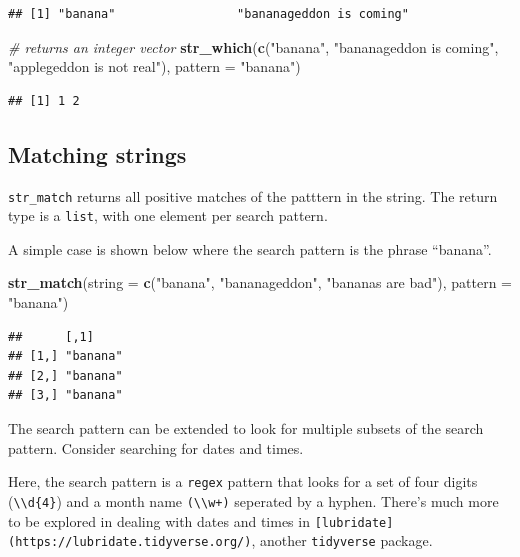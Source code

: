 \documentclass[]{book}
\newenvironment{Shaded}{}{}
\newcommand{\CommentTok}[1]{\textcolor[rgb]{0.38,0.63,0.69}{\textit{#1}}}
\newcommand{\DataTypeTok}[1]{\textcolor[rgb]{0.56,0.13,0.00}{#1}}
\newcommand{\KeywordTok}[1]{\textcolor[rgb]{0.00,0.44,0.13}{\textbf{#1}}}
\newcommand{\NormalTok}[1]{#1}
\newcommand{\StringTok}[1]{\textcolor[rgb]{0.25,0.44,0.63}{#1}}
\begin{document}
\begin{verbatim}
## [1] "banana"                 "bananageddon is coming"
\end{verbatim}

\begin{Shaded}
\begin{Highlighting}[]
\CommentTok{# returns an integer vector}
\KeywordTok{str_which}\NormalTok{(}\KeywordTok{c}\NormalTok{(}\StringTok{"banana"}\NormalTok{,}
             \StringTok{"bananageddon is coming"}\NormalTok{,}
             \StringTok{"applegeddon is not real"}\NormalTok{),}
           \DataTypeTok{pattern =} \StringTok{"banana"}\NormalTok{)}
\end{Highlighting}
\end{Shaded}

\begin{verbatim}
## [1] 1 2
\end{verbatim}

\hypertarget{matching-strings}{%
\subsection{Matching strings}\label{matching-strings}}

\texttt{str\_match} returns all positive matches of the patttern in the string.
The return type is a \texttt{list}, with one element per search pattern.

A simple case is shown below where the search pattern is the phrase ``banana''.

\begin{Shaded}
\begin{Highlighting}[]
\KeywordTok{str_match}\NormalTok{(}\DataTypeTok{string =} \KeywordTok{c}\NormalTok{(}\StringTok{"banana"}\NormalTok{,}
                     \StringTok{"bananageddon"}\NormalTok{,}
                     \StringTok{"bananas are bad"}\NormalTok{),}
          \DataTypeTok{pattern =} \StringTok{"banana"}\NormalTok{)}
\end{Highlighting}
\end{Shaded}

\begin{verbatim}
##      [,1]    
## [1,] "banana"
## [2,] "banana"
## [3,] "banana"
\end{verbatim}

The search pattern can be extended to look for multiple subsets of the search pattern. Consider searching for dates and times.

Here, the search pattern is a \texttt{regex} pattern that looks for a set of four digits (\texttt{\textbackslash{}\textbackslash{}d\{4\}}) and a month name \texttt{(\textbackslash{}\textbackslash{}w+)} seperated by a hyphen. There's much more to be explored in dealing with dates and times in \texttt{{[}lubridate{]}(https://lubridate.tidyverse.org/)}, another \texttt{tidyverse} package.
\end{document}
